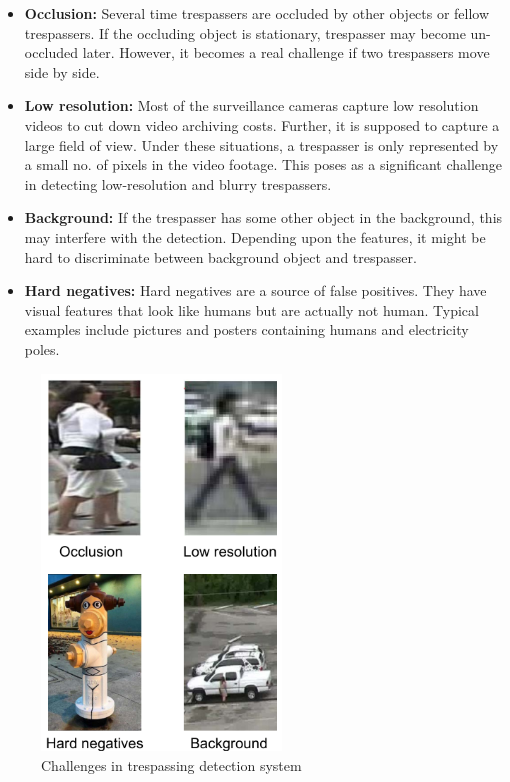 \begin{itemize}
    \item \textbf{Occlusion:} Several time trespassers are occluded by other objects or fellow trespassers. If the occluding object is stationary, trespasser may become un-occluded later. However, it becomes a real challenge if two trespassers move side by side.  
    
    \item \textbf{Low resolution:} Most of the surveillance cameras capture low resolution videos to cut down video archiving costs. Further, it is supposed to capture a large field of view. Under these situations, a trespasser is only represented by a small no. of pixels in the video footage. This poses as a significant challenge in detecting low-resolution and blurry trespassers.
    
    \item \textbf{Background:} If the trespasser has some other object in the background, this may interfere with the detection. Depending upon the features, it might be hard to discriminate between background object and trespasser. 
    
    
    \item \textbf{Hard negatives:} Hard negatives are a source of false positives. They have visual features that look like humans but are actually not human. Typical examples include pictures and posters containing humans and electricity poles. 
    
\end{itemize}

\begin{figure}
    \centering
    \includegraphics[height=10cm]{images/challenges.PNG}
    \caption{Challenges in trespassing detection system}
    \label{fig:challenges}
\end{figure}


